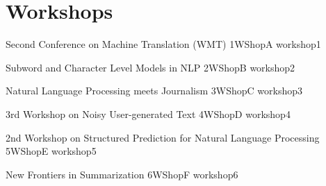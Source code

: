 \chapter[Workshops: \daydate]{Workshops}
\thispagestyle{emptyheader}
\vfill




\clearpage
{}

\begin{wsschedule}
  {Second Conference on Machine Translation (WMT)}
  {1}{WShopA}
  {workshop1}
  {\WShopLocA}
  
\end{wsschedule}
        


\begin{wsschedule}
  {Subword and Character Level Models in NLP}
  {2}{WShopB}
  {workshop2}
  {\WShopLocB}
  
\end{wsschedule}

\begin{wsschedule}
  {Natural Language Processing meets Journalism}
  {3}{WShopC}
  {workshop3}
  {\WShopLocC}
  
\end{wsschedule}

\begin{wsschedule}
  {3rd Workshop on Noisy User-generated Text}
  {4}{WShopD}
  {workshop4}
  {\WShopLocD}
  
\end{wsschedule}

\begin{wsschedule}
  {2nd Workshop on Structured Prediction for Natural Language Processing}
  {5}{WShopE}
  {workshop5}
  {\WShopLocE}
  
\end{wsschedule}

\begin{wsschedule}
  {New Frontiers in Summarization}
  {6}{WShopF}
  {workshop6}
  {\WShopLocF}
  
\end{wsschedule}

